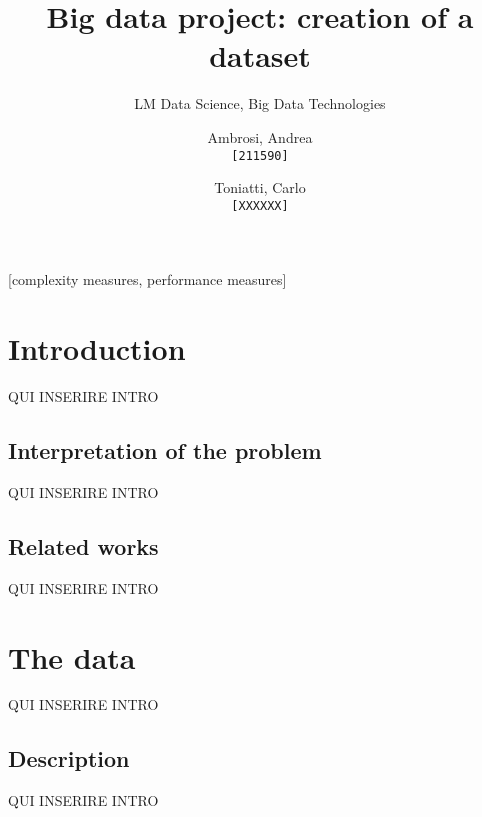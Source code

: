 \documentclass{acm_proc_article-sp-sigmod09}
\begin{document}


\title{Big data project: creation of a dataset}
\subtitle{LM Data Science, Big Data Technologies}

\author{
	Ambrosi, Andrea\\
	\texttt{[211590]}
	\and
	Toniatti, Carlo\\
	\texttt{[XXXXXX]}
}

\maketitle
\begin{abstract}

\end{abstract}

[complexity measures, performance measures]



\section{Introduction}
QUI INSERIRE INTRO

\subsection{Interpretation of the problem}
QUI INSERIRE INTRO

\subsection{Related works}
QUI INSERIRE INTRO

\section{The data}
QUI INSERIRE INTRO

\subsection{Description}
QUI INSERIRE INTRO
\end{document}
